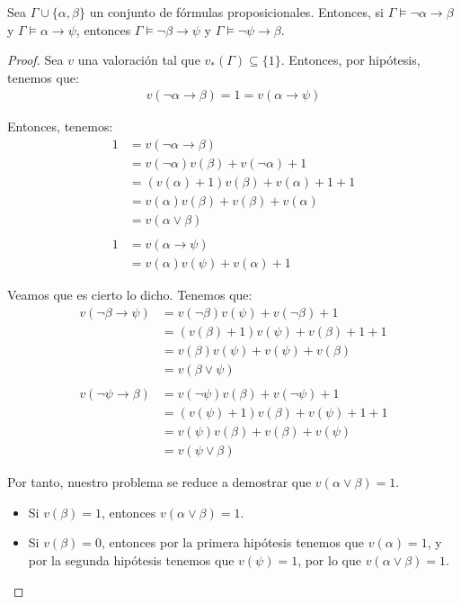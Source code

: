 \begin{ejercicio*}
    Sea $\Gamma \cup \{\alpha,\beta\}$ un conjunto de fórmulas proposicionales.
    Entonces, si $\Gamma \vDash \lnot \alpha \rightarrow \beta$ y $\Gamma \vDash \alpha\rightarrow \psi$,
    entonces $\Gamma \vDash \lnot \beta \rightarrow \psi$ y $\Gamma \vDash \lnot \psi \rightarrow \beta$.
    \begin{proof}
        Sea $v$ una valoración tal que $v_\ast(\Gamma)\subseteq \{1\}$.
        Entonces, por hipótesis, tenemos que:
        \begin{align*}
            v(\lnot \alpha\rightarrow \beta)  = 1 = v(\alpha\rightarrow \psi)
        \end{align*}

        Entonces, tenemos:
        \begin{align*}
            1 &= v(\lnot \alpha \rightarrow \beta)\\
            &=v(\lnot \alpha)v(\beta)+v(\lnot \alpha)+1\\
            &= (v(\alpha)+1)v(\beta)+v(\alpha)+1+1\\
            &= v(\alpha)v(\beta)+v(\beta)+v(\alpha)\\
            &= v(\alpha\lor \beta)\\\\
            1 &= v(\alpha\rightarrow \psi)\\
            &= v(\alpha)v(\psi)+v(\alpha)+1
        \end{align*}

        Veamos que es cierto lo dicho. Tenemos que:
        \begin{align*}
            v(\lnot \beta\rightarrow \psi)
            &= v(\lnot \beta)v(\psi)+v(\lnot \beta)+1\\
            &= (v(\beta)+1)v(\psi)+v(\beta)+1+1\\
            &= v(\beta)v(\psi)+v(\psi)+v(\beta)\\
            &= v(\beta\lor \psi)\\ \\
            v(\lnot \psi\rightarrow \beta)
            &= v(\lnot \psi)v(\beta)+v(\lnot \psi)+1\\
            &= (v(\psi)+1)v(\beta)+v(\psi)+1+1\\
            &= v(\psi)v(\beta)+v(\beta)+v(\psi)\\
            &= v(\psi\lor \beta)
        \end{align*}

        Por tanto, nuestro problema se reduce a demostrar que $v(\alpha\lor \beta)=1$.
        \begin{itemize}
            \item Si $v(\beta)=1$, entonces $v(\alpha\lor \beta)=1$.
            \item Si $v(\beta)=0$, entonces por la primera hipótesis tenemos que $v(\alpha)=1$, y por la
            segunda hipótesis tenemos que $v(\psi)=1$, por lo que $v(\alpha\lor \beta)=1$. 
        \end{itemize}


\end{proof}
\end{ejercicio*}

